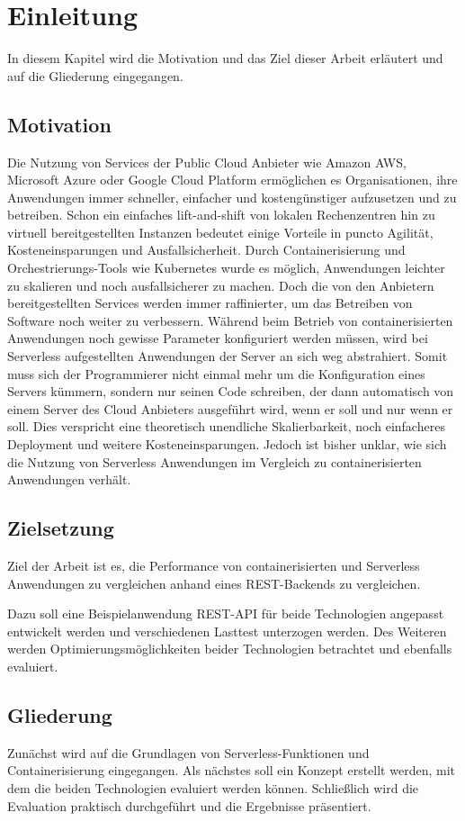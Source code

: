 \chapter{Einleitung}
In diesem Kapitel wird die Motivation und das Ziel dieser Arbeit erläutert und auf die Gliederung eingegangen.

\section{Motivation}
Die Nutzung von Services der Public Cloud Anbieter wie Amazon AWS, Microsoft Azure oder Google Cloud Platform ermöglichen es Organisationen, ihre Anwendungen immer schneller, einfacher und kostengünstiger aufzusetzen und zu betreiben. Schon ein einfaches lift-and-shift von lokalen Rechenzentren hin zu virtuell bereitgestellten Instanzen bedeutet einige Vorteile in puncto Agilität, Kosteneinsparungen und Ausfallsicherheit. Durch Containerisierung und Orchestrierungs-Tools wie Kubernetes wurde es möglich, Anwendungen leichter zu skalieren und noch ausfallsicherer zu machen. Doch die von den Anbietern bereitgestellten Services werden immer raffinierter, um das Betreiben von Software noch weiter zu verbessern. Während beim Betrieb von containerisierten Anwendungen noch gewisse Parameter konfiguriert werden müssen, wird bei Serverless aufgestellten Anwendungen der Server an sich weg abstrahiert. Somit muss sich der Programmierer nicht einmal mehr um die Konfiguration eines Servers kümmern, sondern nur seinen Code schreiben, der dann automatisch von einem Server des Cloud Anbieters ausgeführt wird, wenn er soll und nur wenn er soll. Dies verspricht eine theoretisch unendliche Skalierbarkeit, noch einfacheres Deployment und weitere Kosteneinsparungen. Jedoch ist bisher unklar, wie sich die Nutzung von Serverless Anwendungen im Vergleich zu containerisierten Anwendungen verhält. 

\section{Zielsetzung}
Ziel der Arbeit ist es, die Performance von containerisierten und Serverless Anwendungen zu vergleichen anhand eines REST-Backends zu vergleichen.

Dazu soll eine Beispielanwendung REST-API für beide Technologien angepasst entwickelt werden und verschiedenen Lasttest unterzogen werden. Des Weiteren werden Optimierungsmöglichkeiten beider Technologien betrachtet und ebenfalls evaluiert.

\section{Gliederung}
Zunächst wird auf die Grundlagen von Serverless-Funktionen und Containerisierung eingegangen. Als nächstes soll ein Konzept erstellt werden, mit dem die beiden Technologien evaluiert werden können. Schließlich wird die Evaluation praktisch durchgeführt und die Ergebnisse präsentiert.